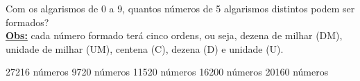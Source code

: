 Com os algarismos de 0 a 9, quantos números  de 5 algarismos distintos podem ser formados?\\
\underline{\bf Obs:} cada número formado terá cinco ordens, ou seja, dezena de milhar (DM), unidade de milhar (UM), centena (C), dezena (D) e unidade (U).

27216 números
9720 números
11520 números
16200 números
20160 números



